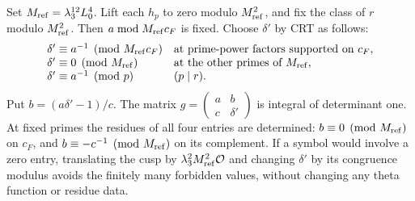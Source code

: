 \documentclass[12pt]{article}
\begin{document}
Set \(M_{\rm ref}=\lambda_3^{12}L_0^4\).
Lift each \(h_p\) to zero modulo \(M_{\rm ref}^2\), and fix the
class of \(r\) modulo \(M_{\rm ref}^2\).
Then \(a\bmod M_{\rm ref}c_F\) is fixed.
Choose \(\delta'\) by CRT as follows:
\[
 \begin{array}{ll}
 \delta'\equiv a^{-1}\pmod{M_{\rm ref}c_F}
       &\text{at prime-power factors supported on }c_F,\\
 \delta'\equiv0\pmod{M_{\rm ref}}
       &\text{at the other primes of }M_{\rm ref},\\
 \delta'\equiv a^{-1}\pmod p& (p\mid r).
 \end{array}
\]
Put \(b=(a\delta'-1)/c\).
The matrix \(g=\left(\begin{smallmatrix}a&b\\c&\delta'\end{smallmatrix}\right)\)
is integral of determinant one.
At fixed primes the residues of all four entries are determined:
\(b\equiv0\pmod{M_{\rm ref}}\) on \(c_F\), and
\(b\equiv-c^{-1}\pmod{M_{\rm ref}}\) on its complement.
If a symbol would involve a zero entry, translating the cusp by
\(\lambda_3^2M_{\rm ref}^2\mathcal O\) and changing \(\delta'\)
by its congruence modulus avoids the finitely many forbidden
values, without changing any theta function or residue data.
\end{document}
